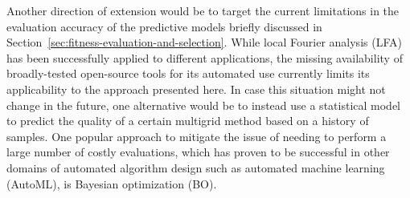 Another direction of extension would be to target the current limitations in the evaluation accuracy of the predictive models briefly discussed in Section~\ref{sec:fitness-evaluation-and-selection}.
While local Fourier analysis (LFA) has been successfully applied to different applications, the missing availability of broadly-tested open-source tools for its automated use currently limits its applicability to the approach presented here.
In case this situation might not change in the future, one alternative would be to instead use a statistical model to predict the quality of a certain multigrid method based on a history of samples.
One popular approach to mitigate the issue of needing to perform a large number of costly evaluations, which has proven to be successful in other domains of automated algorithm design such as automated machine learning (AutoML), is Bayesian optimization (BO).%